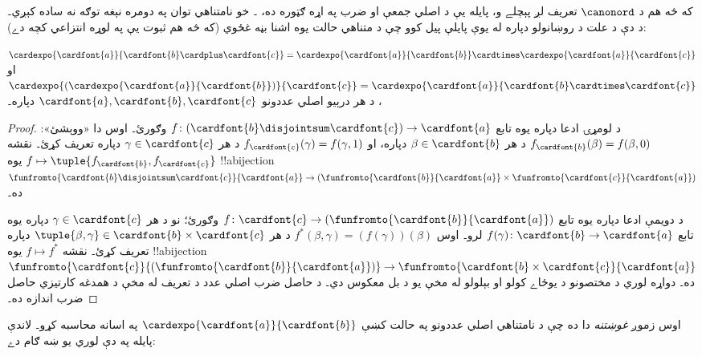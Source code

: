 \documentclass[../../../include/open-logic-section]{subfiles}
\begin{document}


که څه هم د $\canonord$ تعريف لږ پېچلے و، پايله يې د اصلي جمعې
او ضرب په اړه ګټوره ده، ۔ خو
نامتناهي توان په دومره نېغه توګه نه ساده کېږي۔ د دې د علت د
روښانولو دپاره له يوې پايلې پيل کوو چې د متناهي حالت يوه اشنا
بڼه غځوي (که څه هم ثبوت يې په لوړه انتزاعي کچه دے):

\begin{prop}
$\cardexpo{\cardfont{a}}{\cardfont{b} \cardplus \cardfont{c}} =
\cardexpo{\cardfont{a}}{\cardfont{b}} \cardtimes
\cardexpo{\cardfont{a}}{\cardfont{c}}$ او
$\cardexpo{(\cardexpo{\cardfont{a}}{\cardfont{b}})}{\cardfont{c}} =
\cardexpo{\cardfont{a}}{\cardfont{b} \cardtimes \cardfont{c}}$، د
هر درېيو اصلي عددونو $\cardfont{a}, \cardfont{b}, \cardfont{c}$ دپاره۔
\end{prop}

\begin{proof}
د لومړۍ ادعا دپاره يوه تابع $f \colon
(\cardfont{b}\disjointsum\cardfont{c}) \to \cardfont{a}$ وګورئ۔ اوس
دا «ووېشئ»: $f_\cardfont{b}(\beta) = f(\beta, 0)$ د هر
$\beta \in \cardfont{b}$ دپاره، او $f_\cardfont{c}(\gamma) = f(\gamma, 1)$
د هر $\gamma \in \cardfont{c}$ دپاره تعريف کړئ۔ نقشه $f \mapsto
\tuple{f_{\cardfont{b}}, f_\cardfont{c}}$ يوه !!a{bijection}
$\funfromto{\cardfont{b} \disjointsum \cardfont{c}}{\cardfont{a}} \to
(\funfromto{\cardfont{b}}{\cardfont{a}} \times
\funfromto{\cardfont{c}}{\cardfont{a}})$ ده۔

د دويمې ادعا دپاره يوه تابع $f \colon \cardfont{c} \to
(\funfromto{\cardfont{b}}{\cardfont{a}})$ وګورئ؛ نو د هر
$\gamma \in
\cardfont{c}$ دپاره يوه تابع $f(\gamma) \colon \cardfont{b} \to
\cardfont{a}$ لرو۔ اوس
$f^*(\beta, \gamma) = (f(\gamma))(\beta)$ د هر
$\tuple{\beta, \gamma} \in \cardfont{b} \times \cardfont{c}$
دپاره تعريف کړئ۔ نقشه
$f \mapsto f^*$ يوه !!a{bijection}
$\funfromto{\cardfont{c}}{(\funfromto{\cardfont{b}}{\cardfont{a}})}
\to \funfromto{\cardfont{b} \times \cardfont{c}}{\cardfont{a}}$ ده۔
دواړه لوري د مختصونو د يوځاے کولو او بېلولو له مخې يو د بل
معکوس دي۔ د حاصل ضرب اصلي عدد د تعريف له مخې د همدغه
کارتيزي حاصل ضرب اندازه ده۔
\end{proof}

اوس زموږ \emph{غوښتنه} دا ده چې د نامتناهي اصلي عددونو په حالت
کښې $\cardexpo{\cardfont{a}}{\cardfont{b}}$ په اسانه محاسبه کړو۔
لاندې پايله په دې لوري يو ښه ګام دے:
\end{document}
